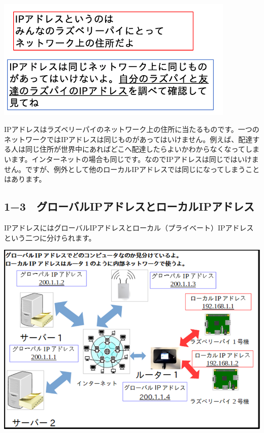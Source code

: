 \documentclass[a4paper,12pt,dvipdfmx]{jarticle}
\begin{document}
\bigskip


\bigskip


\bigskip





\centering
\includegraphics[width=11.412cm]{ome7-img004.png}
\flushleft


\bigskip


\bigskip


\bigskip


\bigskip


\bigskip


\bigskip


\bigskip

IPアドレスはラズベリーパイのネットワーク上の住所に当たるものです。一つのネットワークではIPアドレスは同じものがあってはいけません。例えば、配達する人は同じ住所が世界中にあればどこへ配達したらよいかわからなくなってしまいます。インターネットの場合も同じです。なのでIPアドレスは同じではいけません。ですが、例外として他のローカルIPアドレスでは同じになってしまうことはあります。%

\clearpage\subsection*{\bfseries
	1−3　グローバルIPアドレスとローカルIPアドレス}
IPアドレスにはグローバルIPアドレスとローカル（プライベート）IPアドレスという二つに分けられます。



\centering
\includegraphics[width=15.0cm]{ome7-img005.png}
\end{document}
